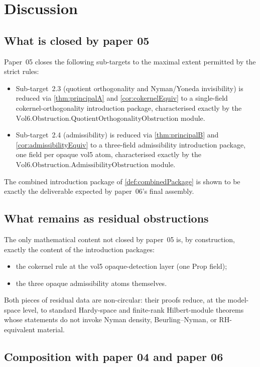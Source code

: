 \documentclass[12pt]{article}
\theoremstyle{definition}
\theoremstyle{remark}
\begin{document}
\section{Discussion}\label{sec:discussion}

\subsection{What is closed by paper 05}

Paper~05 closes the following sub-targets to the maximal extent permitted by the strict rules:
\begin{itemize}
  \item Sub-target~2.3 (quotient orthogonality and Nyman/Yoneda invisibility) is reduced via \cref{thm:principalA} and \cref{cor:cokernelEquiv} to a single-field cokernel-orthogonality introduction package, characterised exactly by the $\mathrm{Vol6.Obstruction.QuotientOrthogonalityObstruction}$ module.
  \item Sub-target~2.4 (admissibility) is reduced via \cref{thm:principalB} and \cref{cor:admissibilityEquiv} to a three-field admissibility introduction package, one field per opaque vol5 atom, characterised exactly by the $\mathrm{Vol6.Obstruction.AdmissibilityObstruction}$ module.
\end{itemize}
The combined introduction package of \cref{def:combinedPackage} is shown to be exactly the deliverable expected by paper~06's final assembly.

\subsection{What remains as residual obstructions}

The only mathematical content not closed by paper~05 is, by construction, exactly the content of the introduction packages:
\begin{itemize}
  \item the cokernel rule at the vol5 opaque-detection layer (one Prop field);
  \item the three opaque admissibility atoms themselves.
\end{itemize}
Both pieces of residual data are non-circular: their proofs reduce, at the model-space level, to standard Hardy-space and finite-rank Hilbert-module theorems whose statements do not invoke Nyman density, Beurling--Nyman, or RH-equivalent material.

\subsection{Composition with paper 04 and paper 06}
\end{document}
